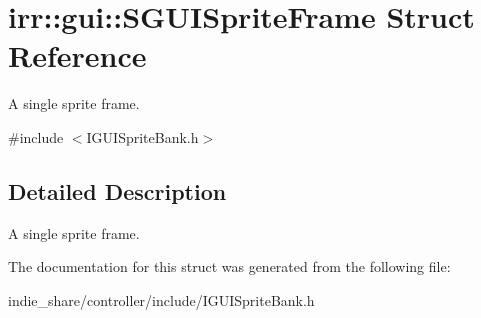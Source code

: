 \hypertarget{structirr_1_1gui_1_1SGUISpriteFrame}{}\section{irr\+:\+:gui\+:\+:S\+G\+U\+I\+Sprite\+Frame Struct Reference}
\label{structirr_1_1gui_1_1SGUISpriteFrame}


A single sprite frame.  




{\ttfamily \#include $<$I\+G\+U\+I\+Sprite\+Bank.\+h$>$}



\subsection{Detailed Description}
A single sprite frame. 

The documentation for this struct was generated from the following file\+:\begin{DoxyCompactItemize}
\item 
indie\+\_\+share/controller/include/I\+G\+U\+I\+Sprite\+Bank.\+h\end{DoxyCompactItemize}
